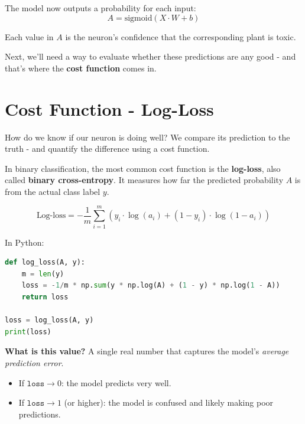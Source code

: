 \documentclass[11pt]{article}
\begin{document}
\vspace{1em}

\noindent The model now outputs a probability for each input:
\[
A = \text{sigmoid}(X \cdot W + b)
\]

Each value in $A$ is the neuron's confidence that the corresponding plant is toxic.

Next, we'll need a way to evaluate whether these predictions are any good - and that's where the \textbf{cost function} comes in.

\section*{Cost Function - Log-Loss}

\begin{tcolorbox}[colback=gray!5, colframe=black!50, title=Step 3: Measuring the Error, fonttitle=\bfseries, arc=2mm]
How do we know if our neuron is doing well?  
We compare its prediction to the truth - and quantify the difference using a cost function.
\end{tcolorbox}

\vspace{1em}

In binary classification, the most common cost function is the \textbf{log-loss}, also called \textbf{binary cross-entropy}.  
It measures how far the predicted probability $A$ is from the actual class label $y$.

\[
\text{Log-loss} = -\frac{1}{m} \sum_{i=1}^{m} \left( y_i \cdot \log(a_i) + (1 - y_i) \cdot \log(1 - a_i) \right)
\]

\noindent In Python:

\begin{lstlisting}[language=Python]
def log_loss(A, y):
    m = len(y)
    loss = -1/m * np.sum(y * np.log(A) + (1 - y) * np.log(1 - A))
    return loss

loss = log_loss(A, y)
print(loss)
\end{lstlisting}

\begin{tcolorbox}[colback=white!98!gray, colframe=gray!30!black, arc=1mm]
\textbf{What is this value?}  
A single real number that captures the model's \textit{average prediction error}.
\end{tcolorbox}

\vspace{1em}

\begin{itemize}
    \item If $\texttt{loss} \rightarrow 0$: the model predicts very well.
    \item If $\texttt{loss} \rightarrow 1$ (or higher): the model is confused and likely making poor predictions.
\end{itemize}
\end{document}
